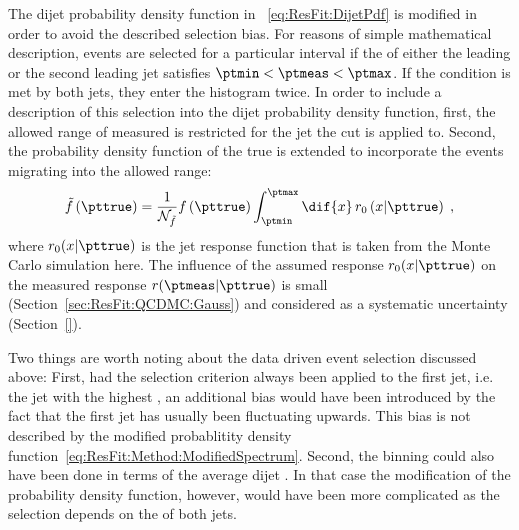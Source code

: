 The dijet probability density function in ~\eqref{eq:ResFit:DijetPdf} is modified in order to avoid the described selection bias.
For reasons of simple mathematical description, events are selected for a particular interval if the \pt of either the leading or the second leading jet satisfies $\ptmin < \ptmeas < \ptmax$.
If the condition is met by both jets, they enter the histogram twice.
In order to include a description of this selection into the dijet probability density function, first, the allowed range of measured \pt is restricted for the jet the \pt cut is applied to.
Second, the probability density function of the true \pt is extended to incorporate the events migrating into the allowed \pt range:
\begin{equation}
  \label{eq:ResFit:Method:ModifiedSpectrum}
  \tilde{f}\left(\pttrue\right) = \frac{1}{\mathcal{N}_{\tilde{f}}}
  f\left(\pttrue\right) \int^{\ptmax}_{\ptmin}\dif{x}\,r_{0}\left(x|\pttrue\right) \; ,
\end{equation}
where $r_{0}(x|\pttrue)$ is the jet \pt response function that is taken from the Monte Carlo simulation here.
The influence of the assumed response $r_{0}(x|\pttrue)$ on the measured response $r(\ptmeas|\pttrue)$ is small (Section~\ref{sec:ResFit:QCDMC:Gauss}) and considered as a systematic uncertainty (Section~\ref{}).

Two things are worth noting about the data driven event selection discussed above:
First, had the selection criterion always been applied to the first jet, i.e. the jet with the highest \ptmeas, an additional bias would have been introduced by the fact that the first jet has usually been fluctuating upwards.
This bias is not described by the modified probablitity density function~\eqref{eq:ResFit:Method:ModifiedSpectrum}.
Second, the binning could also have been done in terms of the average dijet \pt.
In that case the modification of the probability density function, however, would have been more complicated as the selection depends on the \pt of both jets.
